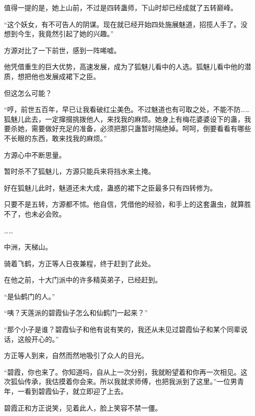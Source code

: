 \begin{this_body}
值得一提的是，她上山前，不过是四转蛊师，下山时却已经成就了五转巅峰。

“这个妖女，有不可告人的阴谋。现在就已经开始四处施展魅道，招揽人手了。没想到今生，我竟然引起了她的兴趣。”

方源对比了一下前世，感到一阵唏嘘。

他凭借重生的巨大优势，高速发展，成为了狐魅儿看中的人选。狐魅儿看中他的潜质，想把他也发展成裙下之臣。

但这怎么可能？

“哼，前世五百年，早已让我看破红尘美色。不过魅道也有可取之处，不能不防……狐魅儿此去，一定撺掇挑拨他人，来找我的麻烦。她身上有梅花婆婆设下的蛊，我要杀她，需要做好充足的准备，必须把那只蛊暂时隔绝掉。呵呵，倒要看看有哪些不长眼的东西，敢来找我的麻烦。”

方源心中不断思量。

暂时杀不了狐魅儿，方源只能兵来将挡水来土掩。

好在狐魅儿此时，魅道还未大成，蛊惑的裙下之臣最多只有四转修为。

只要不是五转，方源都不怵。他自信，凭借他的经验，和手上的这套蛊虫，就算胜不了，也未必会败。

……

中洲，天梯山。

骑着飞鹤，方正等人日夜兼程，终于赶到了此处。

在他之前，十大门派中的许多精英弟子，已经赶到。

“是仙鹤门的人。”

“咦？天莲派的碧霞仙子怎么和仙鹤门一起来？”

“那个小子是谁？碧霞仙子和他有说有笑的，我还从未见过碧霞仙子和某个同辈说话，这般开心的。”

方正等人到来，自然而然地吸引了众人的目光。

“碧霞，你也来了。你知道吗，自从上一次分别，我就盼望着和你再一次相见。这次狐仙传承，我估摸着你会来。所以我就求师傅，也把我派到了这里。”一位男青年，一看到碧霞仙子，就立即迎了上去。

碧霞正和方正说笑，见着此人，脸上笑容不禁一僵。

\end{this_body}

